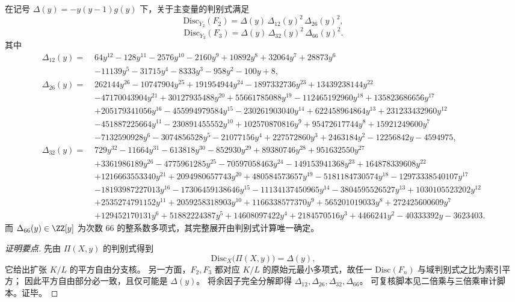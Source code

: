\begin{conclusion}\label{con:xi-terminal-zm-elliptic-weight-modular-discriminant-rigidity}
在记号 \(\Delta(y)=-y(y-1)g(y)\) 下，关于主变量的判别式满足
\[
\mathrm{Disc}_{Y_2}(F_2)
=\Delta(y)\,\Delta_{12}(y)^2\,\Delta_{26}(y)^2,
\]
\[
\mathrm{Disc}_{Y_3}(F_3)
=\Delta(y)\,\Delta_{32}(y)^2\,\Delta_{66}(y)^2.
\]
其中
\[
\begin{aligned}
\Delta_{12}(y)=\;&64y^{12}-128y^{11}-2576y^{10}-2160y^9+10892y^8+32064y^7+28873y^6\\
&-11139y^5-31715y^4-8333y^3-958y^2-100y+8,\\[1mm]
\Delta_{26}(y)=\;&262144y^{26}-10747904y^{25}+191954944y^{24}-1897332736y^{23}+13439238144y^{22}\\
&-47170043904y^{21}+30127935488y^{20}+55661785088y^{19}-112465192960y^{18}+135823686656y^{17}\\
&+205179341056y^{16}-455994979584y^{15}-230261903040y^{14}+622458964864y^{13}+231233432960y^{12}\\
&-451887225664y^{11}-230891455552y^{10}+102570870816y^9+95472617744y^8+15921249600y^7\\
&-7132590928y^6-3074856528y^5-21077156y^4+227572860y^3+2463184y^2-12256842y-4594975,\\[1mm]
\Delta_{32}(y)=\;&729y^{32}-11664y^{31}-613818y^{30}-852930y^{29}+89380746y^{28}+951632550y^{27}\\
&+3361986189y^{26}-4775961285y^{25}-70597058463y^{24}-149153941368y^{23}+164878339608y^{22}\\
&+1216663553340y^{21}+2094980657743y^{20}+480584573657y^{19}-5181184730574y^{18}-12973338540107y^{17}\\
&-18193987227013y^{16}-17306459138646y^{15}-11134137450965y^{14}-3804595526527y^{13}+1030105523202y^{12}\\
&+2535274791152y^{11}+2059258318903y^{10}+1166338577370y^9+565201019033y^8+272425600609y^7\\
&+129452170131y^6+51882224387y^5+14608097422y^4+2184570516y^3+4466241y^2-40333392y-3623403.
\end{aligned}
\]
而 \(\Delta_{66}(y)\in\ZZ[y]\) 为次数 \(66\) 的整系数多项式，其完整展开由判别式计算唯一确定。
\end{conclusion}
\begin{proof}[证明要点]
先由 \(\Pi(X,y)\) 的判别式得到
\[
\mathrm{Disc}_{X}\!\bigl(\Pi(X,y)\bigr)=\Delta(y),
\]
它给出扩张 \(K/L\) 的平方自由分支核。
另一方面，\(F_2,F_3\) 都对应 \(K/L\) 的原始元最小多项式，故任一 \(\mathrm{Disc}(F_n)\) 与域判别式之比为索引平方；
因此平方自由部分必一致，且仅可能是 \(\Delta(y)\)。
将余因子完全分解即得 \(\Delta_{12},\Delta_{26},\Delta_{32},\Delta_{66}\)。
可复核脚本见二倍乘与三倍乘审计脚本。证毕。
\end{proof}

